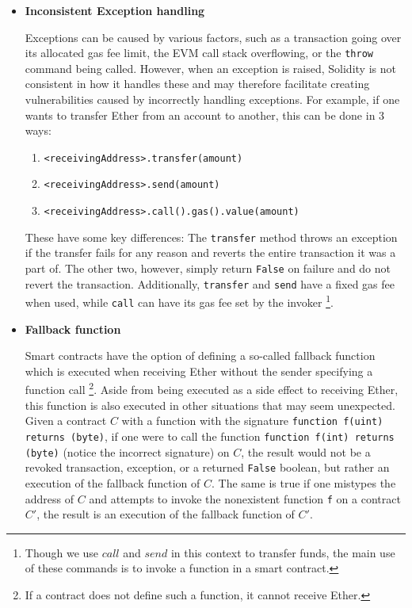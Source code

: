 \documentclass[letterpaper,twocolumn,10pt]{article}
\begin{document}
\begin{itemize}
  \item \textbf{Inconsistent Exception handling}

	Exceptions can be caused by various factors, such as a transaction going over its allocated gas fee limit, the EVM call stack overflowing, or the \verb|throw| command being called. However, when an exception is raised, Solidity is not consistent in how it handles these and may therefore facilitate creating vulnerabilities caused by incorrectly handling exceptions. For example, if one wants to transfer Ether from an account to another, this can be done in 3 ways:
	\begin{enumerate}
	\item \verb|<receivingAddress>.transfer(amount)|
	\item \verb|<receivingAddress>.send(amount)|
	\item \verb|<receivingAddress>.call().gas().value(amount)|
	\end{enumerate}

	These have some key differences: The \verb|transfer| method throws an exception if the transfer fails for any reason and reverts the entire transaction it was a part of. The other two, however, simply return \verb|False| on failure and do not revert the transaction. Additionally, \verb|transfer| and \verb|send| have a fixed gas fee when used, while \verb|call| can have its gas fee set by the invoker \footnote{Though we use $call$ and $send$ in this context to transfer funds, the main use of these commands is to invoke a function in a smart contract.}.
  \item \textbf{Fallback function}

  Smart contracts have the option of defining a so-called fallback function which is executed when receiving Ether without the sender specifying a function call \footnote{If a contract does not define such a function, it cannot receive Ether.}. Aside from being executed as a side effect to receiving Ether, this function is also executed in other situations that may seem unexpected. Given a contract $C$ with a function with the signature \verb|function f(uint) returns (byte)|, if one were to call the function \verb|function f(int) returns (byte)| (notice the incorrect signature) on $C$, the result would not be a revoked transaction, exception, or a returned \verb|False| boolean, but rather an execution of the fallback function of $C$. The same is true if one mistypes the address of $C$ and attempts to invoke the nonexistent function \verb|f| on a contract $C'$, the result is an execution of the fallback function of $C'$.


\end{itemize}
\end{document}
